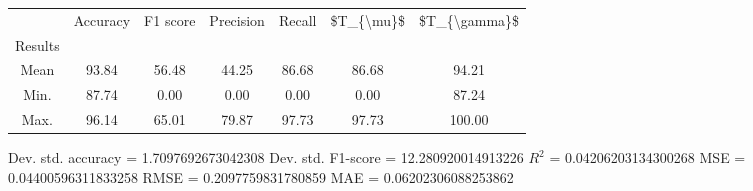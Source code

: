 \begin{tabular}{|c|c|c|c|c|c|c|}
\toprule
{} &  Accuracy &  F1 score &  Precision &  Recall &  \$T\_\{\textbackslash mu\}\$ &  \$T\_\{\textbackslash gamma\}\$ \\
Results &           &           &            &         &            &               \\
\hline
Mean    &     93.84 &     56.48 &      44.25 &   86.68 &      86.68 &         94.21 \\
Min.    &     87.74 &      0.00 &       0.00 &    0.00 &       0.00 &         87.24 \\
Max.    &     96.14 &     65.01 &      79.87 &   97.73 &      97.73 &        100.00 \\
\bottomrule
\end{tabular}

 Dev. std. accuracy = 1.7097692673042308
 Dev. std. F1-score = 12.280920014913226
 $R^2$ = 0.04206203134300268
 MSE = 0.04400596311833258
 RMSE = 0.2097759831780859
 MAE = 0.06202306088253862